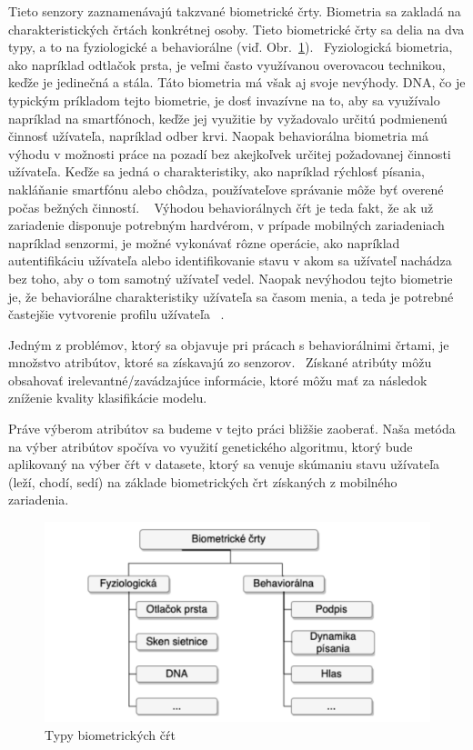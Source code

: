 \documentclass[runningheads]{llncs}
\begin{document}
Tieto senzory zaznamenávajú takzvané biometrické črty.  
Biometria sa zakladá na charakteristických črtách konkrétnej osoby. Tieto biometrické 
črty sa delia na dva typy, a to na fyziologické a behaviorálne 
(viď. Obr.~\ref{fig_rozdelenie_biometrie}).~\cite{ref_teh} Fyziologická biometria, 
ako napríklad odtlačok prsta, je veľmi často využívanou overovacou technikou, 
keďže je jedinečná a stála. Táto biometria má však aj svoje nevýhody. 
DNA, čo je typickým príkladom tejto biometrie, je dosť invazívne na to, 
aby sa využívalo napríklad na smartfónoch, keďže jej využitie by 
vyžadovalo určitú podmienenú činnosť užívateľa, napríklad odber krvi. 
Naopak behaviorálna biometria má výhodu v možnosti práce na pozadí bez akejkoľvek 
určitej požadovanej činnosti užívateľa. Keďže sa jedná o charakteristiky, 
ako napríklad rýchlosť písania, nakláňanie smartfónu alebo chôdza, 
používateľove správanie môže byť overené počas bežných činností. ~\cite{ref_teh}
Výhodou behaviorálnych čŕt je teda fakt, 
že ak už zariadenie disponuje potrebným hardvérom, 
v prípade mobilných zariadeniach napríklad senzormi, 
je možné vykonávať rôzne operácie, ako napríklad autentifikáciu užívateľa alebo 
identifikovanie stavu v akom sa užívateľ nachádza bez toho, aby o 
tom samotný užívateľ vedel. Naopak nevýhodou tejto biometrie je, 
že behaviorálne charakteristiky užívateľa sa časom menia, 
a teda je potrebné častejšie vytvorenie profilu užívateľa ~\cite{ref_seyd}. 

Jedným z problémov, ktorý sa objavuje pri prácach s behaviorálnimi črtami, 
je množstvo atribútov, ktoré sa získavajú zo senzorov.~\cite{ref_nascimento} 
Získané atribúty môžu obsahovať irelevantné/zavádzajúce informácie, ktoré
môžu mať za následok zníženie kvality klasifikácie modelu.
~\cite{ref_babatunde,ref_lu,ref_nascimento,ref_smith,ref_zhao} 

Práve výberom atribútov sa 
budeme v tejto práci bližšie zaoberať. Naša metóda na výber atribútov spočíva vo využití 
genetického algoritmu, ktorý bude aplikovaný na výber čŕt v datasete, ktorý sa venuje skúmaniu
stavu užívateľa (leží, chodí, sedí) na základe biometrických črt získaných z 
mobilného zariadenia.~\cite{ref_dataset_anguita,ref_dataset}


\begin{figure}
\includegraphics[width=\textwidth]{image/rozdelenie_biometrie.png}
\caption{Typy biometrických čŕt~\cite{ref_teh}} \label{fig_rozdelenie_biometrie}
\end{figure}
\end{document}
